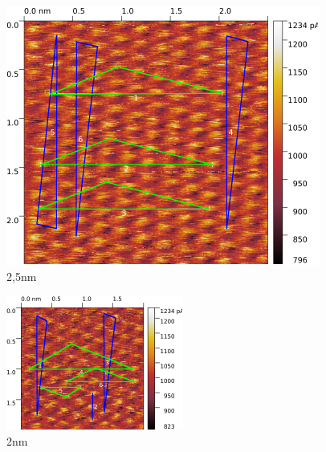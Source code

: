 \begin{figure}[H]
\centering
\includegraphics[width=\textwidth]{../Gwyddion/HOPG/2,5nm_gimped.pdf}
\caption{2,5nm}
\label{2,5nm}
\end{figure}

\begin{figure}[H]
\centering
\includegraphics[width=\textwidth]{../Gwyddion/HOPG/2nm_gimped.pdf}
\caption{2nm}
\label{2nm}
\end{figure}
	

